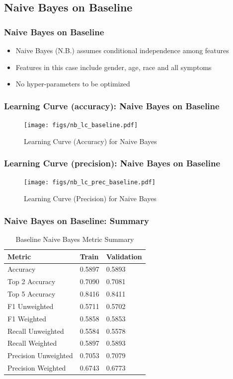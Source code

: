 \documentclass{beamer}
\begin{document}
\subsection{Naive Bayes on Baseline} %
\begin{frame}
\frametitle{Naive Bayes on Baseline}
\begin{itemize}
	\item Naive Bayes (N.B.) assumes conditional independence among features
	\item Features in this case include gender, age, race and all symptoms
	\item No hyper-parameters to be optimized
\end{itemize}
\end{frame}

\begin{frame}
\frametitle{Learning Curve (accuracy): Naive Bayes on Baseline}
\begin{figure}
	\texttt{[image: figs/nb\_lc\_baseline.pdf]}
	\caption{Learning Curve (Accuracy) for Naive Bayes}
\end{figure}
\end{frame}

\begin{frame}
\frametitle{Learning Curve (precision): Naive Bayes on Baseline}
\begin{figure}
	\texttt{[image: figs/nb\_lc\_prec\_baseline.pdf]}
	\caption{Learning Curve (Precision) for Naive Bayes}
\end{figure}
\end{frame}

\begin{frame}
\frametitle{Naive Bayes on Baseline: Summary }
\begin{table}[]
	\begin{tabular}{|l|l|l|}
		\hline
		Metric               & Train  & Validation \\ \hline
		Accuracy             & 0.5897 & 0.5893     \\ \hline
		Top 2 Accuracy       & 0.7090 & 0.7081     \\ \hline
		Top 5 Accuracy       & 0.8416 & 0.8411     \\ \hline
		F1 Unweighted        & 0.5711 & 0.5702     \\ \hline
		F1 Weighted          & 0.5858 & 0.5853     \\ \hline
		Recall Unweighted    & 0.5584 & 0.5578     \\ \hline
		Recall Weighted      & 0.5897 & 0.5893     \\ \hline
		Precision Unweighted & 0.7053 & 0.7079     \\ \hline
		Precision Weighted   & 0.6743 & 0.6773     \\ \hline
	\end{tabular}
	\caption{Baseline Naive Bayes Metric Summary}
	\label{table:tab_1}
\end{table}
\end{frame}
\end{document}
